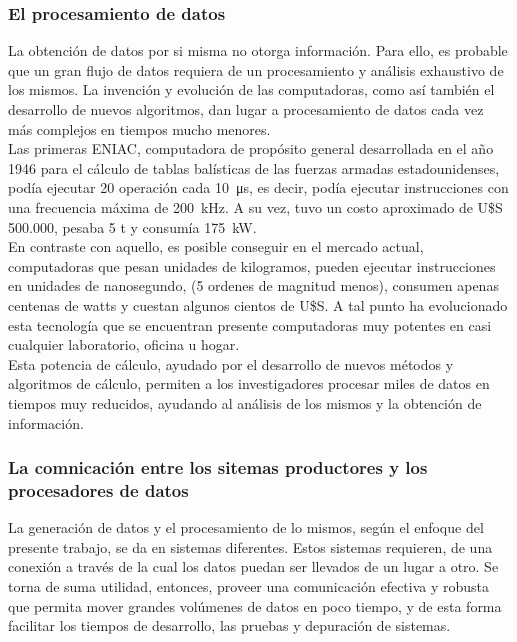 
\subsubsection*{El procesamiento de datos}
La obtención de datos por si misma no otorga información. Para ello, es probable que un gran flujo de datos requiera de un procesamiento y análisis exhaustivo de los mismos. La invención y evolución de las computadoras, como así también el desarrollo de nuevos algoritmos, dan lugar a procesamiento de datos cada vez más complejos en tiempos mucho menores.\\

Las primeras ENIAC, computadora de propósito general desarrollada en el año 1946 para el cálculo de tablas balísticas de las fuerzas armadas estadounidenses, podía ejecutar 20 operación cada \SI{10}{\micro\second}, es decir, podía ejecutar instrucciones con una frecuencia máxima de \SI{200}{\kilo\hertz}. A su vez, tuvo un costo aproximado de U\$S 500.000, pesaba 5 t y consumía \SI{175}{\kilo\watt}.\\

En contraste con aquello, es posible conseguir en el mercado actual, computadoras que pesan unidades de kilogramos, pueden ejecutar instrucciones en unidades de nanosegundo, (5 ordenes de magnitud menos), consumen apenas centenas de watts y cuestan algunos cientos de U\$S. A tal punto ha evolucionado esta tecnología que se encuentran presente computadoras muy potentes en casi cualquier laboratorio, oficina u hogar.\\

Esta potencia de cálculo, ayudado por el desarrollo de nuevos métodos y algoritmos de cálculo, permiten a los investigadores procesar miles de datos en tiempos muy reducidos, ayudando al análisis de los mismos y la obtención de información.\\

\subsubsection*{La comnicación entre los sitemas productores y los procesadores de datos}
La generación de datos y el procesamiento de lo mismos, según el enfoque del presente trabajo, se da en sistemas diferentes. Estos sistemas requieren, de una conexión a través de la cual los datos puedan ser llevados de un lugar a otro. Se torna de suma utilidad, entonces, proveer una comunicación efectiva y robusta que permita mover grandes volúmenes de datos en poco tiempo, y de esta forma facilitar los tiempos de desarrollo, las pruebas y depuración de sistemas.\\

